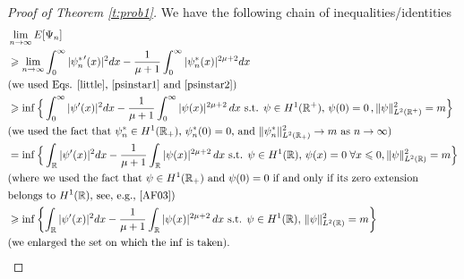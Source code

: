 {\begin{proof}[Proof of Theorem \ref{t:prob1}]
We have the following chain of inequalities/identities  
\begin{align}
&\lim_{n\to \infty} E[\Psi_n] \nonumber \\
& \geq 
\lim_{n\to\infty } \int_0^\infty |{\psi_n^*}'(x)|^2 dx -\frac{1}{\mu+1} \int_0^\infty  |\psi_n^*(x)|^{2\mu+2} dx \nonumber\\
&\text{(we used Eqs. \eqref{little}, \eqref{psinstar1} and \eqref{psinstar2})} \nonumber \\
&   \geq \inf \Big\{ \int_0^\infty |\psi ' (x)|^{2} dx -\frac{1}{\mu+1} \int_0^\infty |\psi (x)|^{2\mu+2} \, dx  \text{ s.t. } \psi\in H^1(\RE^+), \, \psi(0)=0\, ,\| \psi\|_{L^2(\RE^+)}^2 =m \Big\} \nonumber \\ 
&\text{(we used the fact that $\psi_n^*\in H^1(\RE_+)$,  $\psi_n^*(0)= 0$, and $\|\psi_n^*\|_{L^2(\RE_+)}^2 \to  m$ as $n\to\infty$)} \nonumber
\\ 
&  =  \inf \Big\{  \int_\RE |{\psi}' (x)|^{2} dx-\frac{1}{\mu+1} \int_\RE|{\psi} (x)|^{2\mu+2} \, dx   \text{ s.t. } \psi\in H^1(\RE), \, \psi(x)=0 \; \forall x\leq 0 ,\| \psi\|_{L^2(\RE)}^2 =m  \Big\}\nonumber \\
&\text{(where we used the fact that $\psi\in H^1(\RE_+)$ and $\psi(0)= 0$ if and only if its zero extension} \nonumber\\
&\text{belongs to $H^1(\RE)$, see, e.g., \cite[Th. 5.29]{AF03}})\nonumber
\\ 
& \geq \inf \left\{  \int_\RE |\psi  ' (x)|^{2} dx-\frac{1}{\mu+1} \int_\RE|\psi (x)|^{2\mu+2} \, dx  \text{ s.t. } \psi\in H^1(\RE), \, \| \psi\|_{L^2(\RE)}^2 =m  \right\} \label{infsol}\\
&\text{(we enlarged the set on which the $\inf$ is taken).} \nonumber
\end{align}


\end{proof}}
